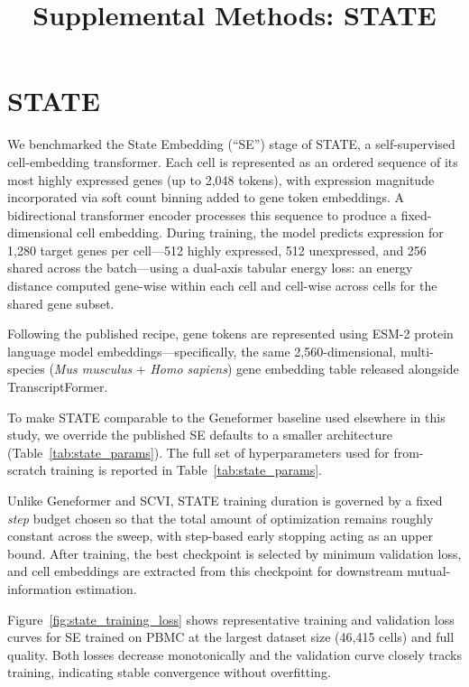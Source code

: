 \documentclass{article}
\title{Supplemental Methods: STATE}
\author{}
\date{}
\begin{document}
\maketitle

\section{STATE}

We benchmarked the State Embedding (``SE'') stage of STATE\cite{adduri2025state}, a self-supervised cell-embedding transformer. Each cell is represented as an ordered sequence of its most highly expressed genes (up to 2{,}048 tokens), with expression magnitude incorporated via soft count binning added to gene token embeddings. A bidirectional transformer encoder processes this sequence to produce a fixed-dimensional cell embedding. During training, the model predicts expression for 1{,}280 target genes per cell---512 highly expressed, 512 unexpressed, and 256 shared across the batch---using a dual-axis tabular energy loss: an energy distance computed gene-wise within each cell and cell-wise across cells for the shared gene subset.

Following the published recipe, gene tokens are represented using ESM-2\cite{lin2023esm2} protein language model embeddings---specifically, the same 2{,}560-dimensional, multi-species (\emph{Mus musculus} + \emph{Homo sapiens}) gene embedding table released alongside TranscriptFormer\cite{pearce2025transcriptformer}.

To make STATE comparable to the Geneformer\cite{theodoris2023geneformer} baseline used elsewhere in this study, we override the published SE defaults to a smaller architecture (Table~\ref{tab:state_params}). The full set of hyperparameters used for from-scratch training is reported in Table~\ref{tab:state_params}.

Unlike Geneformer and SCVI, STATE training duration is governed by a fixed \emph{step} budget chosen so that the total amount of optimization remains roughly constant across the sweep, with step-based early stopping acting as an upper bound. After training, the best checkpoint is selected by minimum validation loss, and cell embeddings are extracted from this checkpoint for downstream mutual-information estimation.

Figure~\ref{fig:state_training_loss} shows representative training and validation loss curves for SE trained on PBMC at the largest dataset size (46{,}415 cells) and full quality. Both losses decrease monotonically and the validation curve closely tracks training, indicating stable convergence without overfitting.
\end{document}
